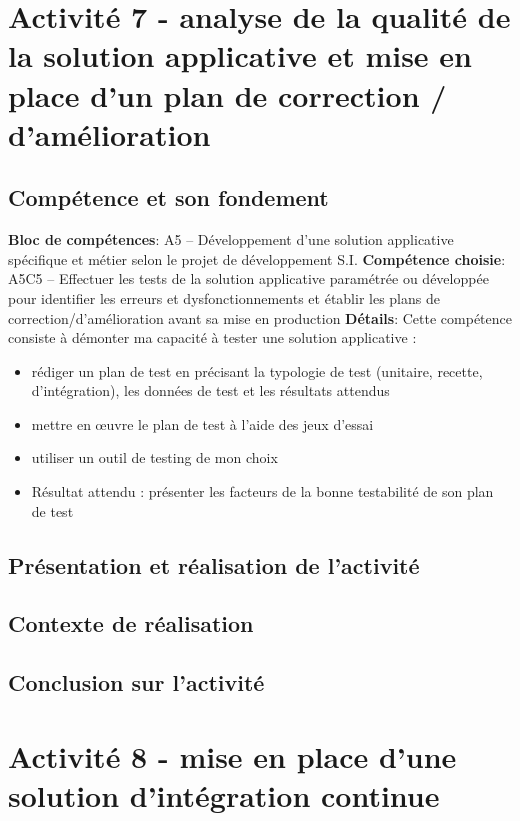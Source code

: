 \documentclass[a4paper, 11pt]{report}
\begin{document}
\section{Activité 7 - analyse de la qualité de la solution applicative et mise en place d’un plan de correction / d’amélioration}
\subsection{Compétence et son fondement}
\textbf{Bloc de compétences}: A5 – Développement d’une solution applicative spécifique et métier selon le projet de développement S.I.
\newline
\textbf{Compétence choisie}: A5C5 – Effectuer les tests de la solution applicative paramétrée ou développée pour identifier les erreurs et dysfonctionnements et établir les plans de correction/d’amélioration avant sa mise en production
\newline
\textbf{Détails}: Cette compétence consiste à démonter ma capacité à tester une solution applicative :
\begin{itemize}
  \item rédiger un plan de test en précisant la typologie de test (unitaire, recette, d’intégration), les données de test et les résultats attendus
  \item mettre en œuvre le plan de test à l’aide des jeux d’essai
  \item utiliser un outil de testing de mon choix
  \item Résultat attendu : présenter les facteurs de la bonne testabilité de son plan de test
\end{itemize}
\subsection{Présentation et réalisation de l'activité}
\subsection{Contexte de réalisation}
\subsection{Conclusion sur l'activité}

\section{Activité 8 - mise en place d’une solution d’intégration continue}
\end{document}
